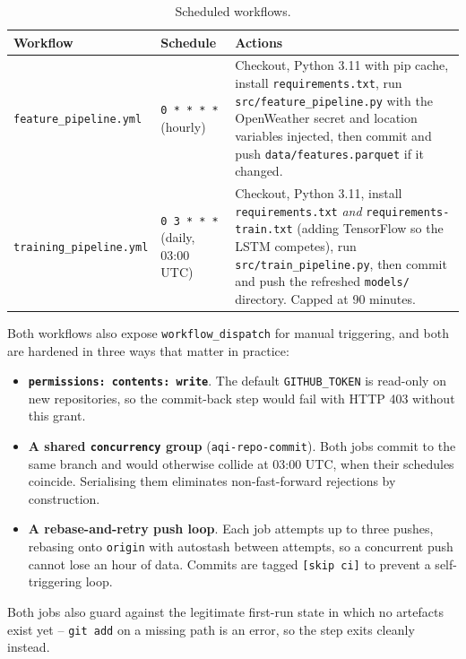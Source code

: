 \documentclass[11pt,a4paper]{article}
\begin{document}
\begin{table}[H]
\centering
\caption{Scheduled workflows.}
\label{tab:workflows}
\small
\begin{tabular}{@{}p{3.75cm}p{2.15cm}p{8.2cm}@{}}
\toprule
\textbf{Workflow} & \textbf{Schedule} & \textbf{Actions}\\
\midrule
\texttt{feature\_pipeline.yml}
& \texttt{0 * * * *}\newline (hourly)
& Checkout, Python 3.11 with pip cache, install
\texttt{requirements.txt}, run \texttt{src/feature\_pipeline.py} with the
OpenWeather secret and location variables injected, then commit and push
\texttt{data/features.parquet} if it changed.\\
\addlinespace
\texttt{training\_pipeline.yml}
& \texttt{0 3 * * *}\newline (daily, 03:00 UTC)
& Checkout, Python 3.11, install \texttt{requirements.txt} \emph{and}
\texttt{requirements-train.txt} (adding TensorFlow so the LSTM competes), run
\texttt{src/train\_pipeline.py}, then commit and push the refreshed
\texttt{models/} directory. Capped at 90 minutes.\\
\bottomrule
\end{tabular}
\end{table}

Both workflows also expose \texttt{workflow\_dispatch} for manual triggering,
and both are hardened in three ways that matter in practice:

\begin{itemize}[itemsep=2pt]
  \item \textbf{\texttt{permissions: contents: write}}. The default
        \texttt{GITHUB\_TOKEN} is read-only on new repositories, so the
        commit-back step would fail with HTTP 403 without this grant.
  \item \textbf{A shared \texttt{concurrency} group}
        (\texttt{aqi-repo-commit}). Both jobs commit to the same branch and
        would otherwise collide at 03:00 UTC, when their schedules coincide.
        Serialising them eliminates non-fast-forward rejections by
        construction.
  \item \textbf{A rebase-and-retry push loop}. Each job attempts up to three
        pushes, rebasing onto \texttt{origin} with autostash between attempts,
        so a concurrent push cannot lose an hour of data. Commits are tagged
        \texttt{[skip ci]} to prevent a self-triggering loop.
\end{itemize}

Both jobs also guard against the legitimate first-run state in which no
artefacts exist yet -- \texttt{git add} on a missing path is an error, so the
step exits cleanly instead.
\end{document}
